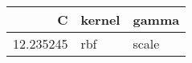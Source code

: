 \begin{tabular}{rll}
\toprule
C & kernel & gamma \\
\midrule
12.235245 & rbf & scale \\
\bottomrule
\end{tabular}
